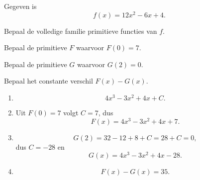 \documentclass{ximera}
\begin{document}
\begin{oefening}{\oefU}

Gegeven is
\[
f(x)=12x^2-6x+4.
\]

\begin{question}
Bepaal de volledige familie primitieve functies van $f$.
\end{question}

\begin{question}
Bepaal de primitieve $F$ waarvoor $F(0)=7$.
\end{question}

\begin{question}
Bepaal de primitieve $G$ waarvoor $G(2)=0$.
\end{question}

\begin{question}
Bepaal het constante verschil $F(x)-G(x)$.
\end{question}

\begin{oplossing}

\begin{enumerate}
\item
\[
4x^3-3x^2+4x+C.
\]

\item Uit $F(0)=7$ volgt $C=7$, dus
\[
F(x)=4x^3-3x^2+4x+7.
\]

\item
\[
G(2)=32-12+8+C=28+C=0,
\]
dus $C=-28$ en
\[
G(x)=4x^3-3x^2+4x-28.
\]

\item
\[
F(x)-G(x)=35.
\]
\end{enumerate}

\end{oplossing}

\end{oefening}


\end{document}
